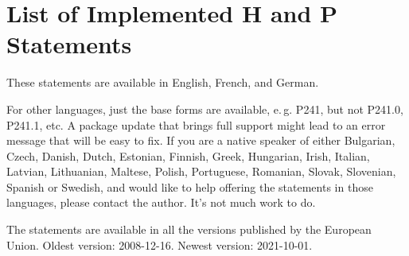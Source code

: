 \documentclass[a4paper,notitlepage,parskip=half]{scrreprt}
\begin{document}
\section{List of Implemented H and P Statements}

These statements are available in English, French, and German.

For other languages, just the base forms are available, e.\,g. P241, but not P241.0, P241.1, etc.
A package update that brings full support might lead to an error message that will be easy to fix.
If you are a native speaker of either
Bulgarian,
Czech,
Danish,
Dutch,
Estonian,
Finnish,
Greek,
Hungarian,
Irish,
Italian,
Latvian,
Lithuanian,
Maltese,
Polish,
Portuguese,
Romanian,
Slovak,
Slovenian,
Spanish or
Swedish,
and would like to help offering the statements in those languages, please
contact the author. It's not much work to do.

The statements are available in all the versions published by the European Union. Oldest version: 2008-12-16. Newest version: 2021-10-01.%

\medskip
\end{document}
